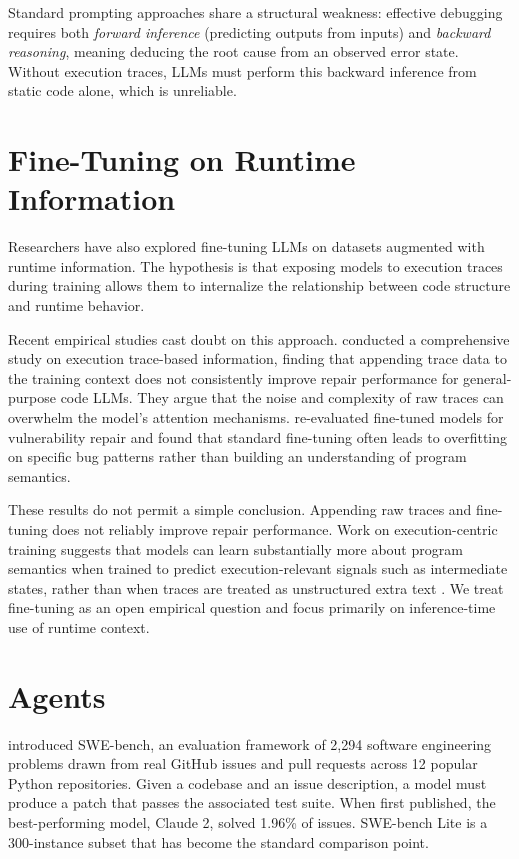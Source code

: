 Standard prompting approaches share a structural weakness: effective debugging requires both \textit{forward inference} (predicting outputs from inputs) and \textit{backward reasoning}, meaning deducing the root cause from an observed error state. Without execution traces, LLMs must perform this backward inference from static code alone, which is unreliable.

\section{Fine-Tuning on Runtime Information}

Researchers have also explored fine-tuning LLMs on datasets augmented with runtime information. The hypothesis is that exposing models to execution traces during training allows them to internalize the relationship between code structure and runtime behavior.

Recent empirical studies cast doubt on this approach. \citet{wang2025codesemanticshelpcomprehensive} conducted a comprehensive study on execution trace-based information, finding that appending trace data to the training context does not consistently improve repair performance for general-purpose code LLMs. They argue that the noise and complexity of raw traces can overwhelm the model's attention mechanisms. \citet{han2025rethinkingcapabilityfinetunedlanguage} re-evaluated fine-tuned models for vulnerability repair and found that standard fine-tuning often leads to overfitting on specific bug patterns rather than building an understanding of program semantics.

These results do not permit a simple conclusion. Appending raw traces and fine-tuning does not reliably improve repair performance. Work on execution-centric training suggests that models can learn substantially more about program semantics when trained to predict execution-relevant signals such as intermediate states, rather than when traces are treated as unstructured extra text \citep{armengolestape2025execution}. We treat fine-tuning as an open empirical question and focus primarily on inference-time use of runtime context.

\section{Agents}
\label{sec:agent-repair}

\citet{jimenez2023swebench} introduced SWE-bench, an evaluation framework of 2,294 software engineering problems drawn from real GitHub issues and pull requests across 12 popular Python repositories. Given a codebase and an issue description, a model must produce a patch that passes the associated test suite. When first published, the best-performing model, Claude 2, solved 1.96\% of issues. SWE-bench Lite is a 300-instance subset that has become the standard comparison point.

